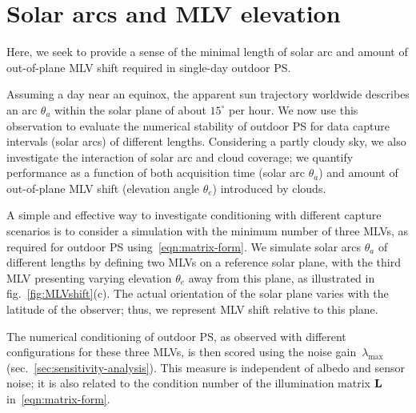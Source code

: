

\section{Solar arcs and MLV elevation}
\label{subsec:solararcs-mlvelevation}


Here, we seek to provide a sense of the minimal length of solar arc and amount of out-of-plane MLV shift required in single-day outdoor PS.

Assuming a day near an equinox, the apparent sun trajectory worldwide describes an arc $\theta_a$ within the solar plane of about $15^\circ$ per hour. We now use this observation to evaluate the numerical stability of outdoor PS for data capture intervals (solar arcs) of different lengths. Considering a partly cloudy sky, we also investigate the interaction of solar arc and cloud coverage; we quantify performance as a function of both acquisition time (solar arc $\theta_a$) and amount of out-of-plane MLV shift (elevation angle $\theta_e$) introduced by clouds.

A simple and effective way to investigate conditioning with different capture scenarios is to consider a simulation with the minimum number of three MLVs, as required for outdoor PS using~\eqref{eqn:matrix-form}. We simulate solar arcs $\theta_a$ of different lengths by defining two MLVs on a reference solar plane, with the third MLV presenting varying elevation $\theta_e$ away from this plane, as illustrated in fig.~\ref{fig:MLVshift}(c). The actual orientation of the solar plane varies with the latitude of the observer; thus, we represent MLV shift relative to this plane.

The numerical conditioning of outdoor PS, as observed with different configurations for these three MLVs, is then scored using the noise gain~$\lambda_{\max}$ (sec.~\ref{sec:sensitivity-analysis}). This measure is independent of albedo and sensor noise; it is also related to the condition number of the illumination matrix ${\bf L}$ in~\eqref{eqn:matrix-form}.


